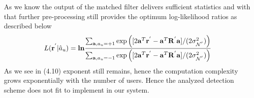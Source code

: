 As we know the output of the matched filter delivers sufficient statistics and with that further pre-processing still provides the optimum log-likelihood ratios as described below
\begin{equation}
L(\mathrm{\mathbf{r}}^{'}\vert \hat{a}_u)=\mathrm{\mathbf{ln}}\frac{\hbox{$\sum_{\mathrm{\mathbf{a}},a_u=+1}\mathrm{exp}\left([2\mathrm{\mathbf{a}}^T\mathrm{\mathbf{r}}^{'}-\mathrm{\mathbf{a}}^T\mathrm{\mathbf{R}}^{'}\mathrm{\mathbf{a}}]/(2\sigma^2_{\mathcal{N}^{'}})\right)$}}{\hbox{$\sum_{\mathrm{\mathbf{a}},a_u=-1}\mathrm{exp}\left([2\mathrm{\mathbf{a}}^T\mathrm{\mathbf{r}}^{'}-\mathrm{\mathbf{a}}^T\mathrm{\mathbf{R}}^{'}\mathrm{\mathbf{a}}]/(2\sigma^2_{\mathcal{N}^{'}})\right)$}}
\end{equation}
As we see in (4.10) exponent still remains, hence the computation complexity grows exponentially with the number of users. Hence the analyzed detection scheme does not fit to implement in our system. 
